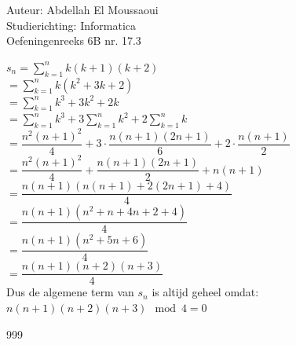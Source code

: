 \documentclass[a4paper]{article}
\begin{document}
  
\noindent \large Auteur: Abdellah El Moussaoui \\
\noindent \large Studierichting: Informatica\\
\noindent \large Oefeningenreeks 6B nr. 17.3\\

\medskip

\normalsize

$\displaystyle s_n=\sum_{k=1}^{n}k(k+1)(k+2)$\\

$= \displaystyle\sum_{k=1}^{n}k\left(k^2+3k+2\right)$\\

$= \displaystyle\sum_{k=1}^{n}k^3+3k^2+2k$\\

$= \displaystyle\sum_{k=1}^{n}k^3+3\displaystyle\sum_{k=1}^{n}k^2+2\displaystyle\sum_{k=1}^{n}k$\\

$= \dfrac{n^2\left(n+1\right)^2}{4}+3\cdot \dfrac{n\left(n+1\right)\left(2n+1\right)}{6}+ 2\cdot \dfrac{n\left(n+1\right)}{2}$\\

$= \dfrac{n^2\left(n+1\right)^2}{4}+\dfrac{n\left(n+1\right)\left(2n+1\right)}{2}+n\left(n+1\right)$\\

$= \dfrac{n\left(n+1\right)\left(n\left(n+1\right)+2\left(2n+1\right)+4\right)}{4}$\\

$= \dfrac{n\left(n+1\right)\left(n^2+n+4n+2+4\right)}{4}$\\

$= \dfrac{n\left(n+1\right)\left(n^2+5n+6\right)}{4}$\\


$= \dfrac{n\left(n+1\right)\left(n+2\right)\left(n+3\right)}{4}$\\


Dus de algemene term van $s_n$ is altijd geheel omdat: \\

$n\left(n+1\right)\left(n+2\right)\left(n+3\right) \mod 4 = 0$\\

\begin{thebibliography}{999}
\end{thebibliography}
\end{document}
